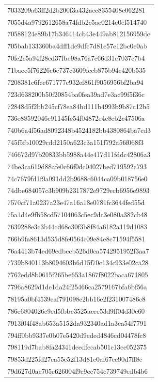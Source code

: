\begin{tabular}{l}
7033209a63ff2d2b200f3a432aec8355408e062281 \\
7055d4a9792612658a74fdb2e5ae0214e0ef514740 \\
70588124e89b17b346414cb43e449ab812156959dc \\
705bab133360ba4dff1de9dfc7d81e57c12bc0e0ab \\
70fe2c5a94f28cd37fbe98a76a7e66d31c7037c7b4 \\
71bacc5f76226c6c737c3609fccb875b94e420b535 \\
7208381c6fee671777c932ef861f9056956bf2ba94 \\
723d638200b50f20854ba0fea39ad7e3ac99f5f36c \\
72848d5f2bb245cf78ea84bd111b4993b9b87c12b5 \\
736e88592046c91145fc54f04872e4e8eb2c47506a \\
740b6a4f56ad8092348b4524182bb4380864ba7cd3 \\
745f5fb10029cdd2150a623c3a151f792a56f068f3 \\
746672d97b20833bb5988a44e417d11fddc42806a3 \\
74be3ca619d88afe0c66f0dc04027bed719592c793 \\
74c7679fd1f9a091dd2b9688c6044ca09b018756e0 \\
74dbe684057c3b909b2317872e9729ecb6956e9893 \\
7570cf71a0237a23e47a16a18e0781fc3644fed55d \\
75a1d4e9fb58cd57104063c5ec9dc3e080a382cb48 \\
7639288e3c3b44cd68c30f3b8f84a6182a119d1083 \\
766b9fa8613d535d8fe0564c09e84e8c71594f5581 \\
76a4413b74ed69edbecb526d0ca5742951952f3aa7 \\
7739b840113b8094603b6d15f70c134c933e02ca28 \\
7762edd8b0615f265be653a1867f8022baca671805 \\
7796a8629d1de1da24f25466ca2579167bfa6bf56a \\
78195a0bf4539caf791098c2bb16e2f231007486c8 \\
786e6804026e9ed5fbbe3525aeec53d9ff04d30e60 \\
7913f04f48ab653a5152da932340ad1a3ea54f7791 \\
794ff0bb9337e0b07e5420d9cded4846cd04478fc8 \\
798119d7bab8fa24341decdfecab501c13ec052375 \\
79853d225fd27ca55e52f13d81e0af67ec90d7ff8e \\
79d627d0ac705e626004f9c9ec754e739749edb4b6 \\

\end{tabular}
